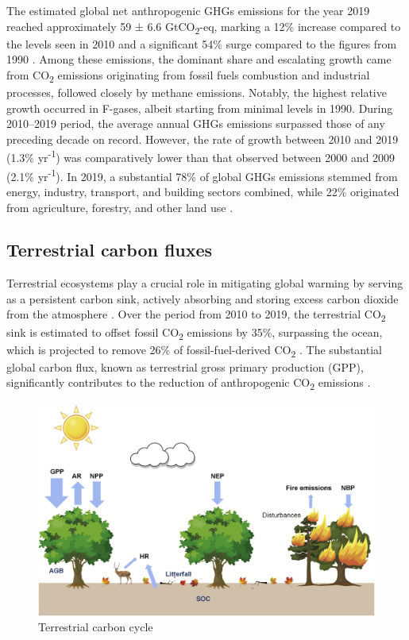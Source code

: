 The estimated global net anthropogenic GHGs emissions for the year 2019 reached approximately 59 ± 6.6 GtCO\textsubscript{2}-eq, marking a 12\% increase compared to the levels seen in 2010 and a significant 54\% surge compared to the figures from 1990 \citep{ipcc2022}. Among these emissions, the dominant share and escalating growth came from CO\textsubscript{2} emissions originating from fossil fuels combustion and industrial processes, followed closely by methane emissions. Notably, the highest relative growth occurred in F-gases, albeit starting from minimal levels in 1990. During 2010–2019 period, the average annual GHGs emissions surpassed those of any preceding decade on record. However, the rate of growth between 2010 and 2019 (1.3\% yr\textsuperscript{-1}) was comparatively lower than that observed between 2000 and 2009 (2.1\% yr\textsuperscript{-1}). In 2019, a substantial 78\% of global GHGs emissions stemmed from energy, industry, transport, and building sectors combined, while 22\% originated from agriculture, forestry, and other land use \citep{ipcc2022}. 

\subsection{Terrestrial carbon fluxes}

Terrestrial ecosystems play a crucial role in mitigating global warming by serving as a persistent carbon sink, actively absorbing and storing excess carbon dioxide from the atmosphere \citep{pan2011large}. Over the period from 2010 to 2019, the terrestrial CO\textsubscript{2} sink is estimated to offset fossil CO\textsubscript{2} emissions by 35\%, surpassing the ocean, which is projected to remove 26\% of fossil-fuel-derived CO\textsubscript{2} \citep{friedlingstein2020global, wang2022disentangling}. The substantial global carbon flux, known as terrestrial gross primary production (GPP), significantly contributes to the reduction of anthropogenic CO\textsubscript{2} emissions \citep{beer2010terrestrial}. \par

\begin{figure}
    \centering
    \includegraphics[width=\textwidth]{figs/chap2/fig1.jpg}
    \caption{Terrestrial carbon cycle \citep{xiao2019remote}}
    \label{fig:chap2_fig1}
\end{figure}


